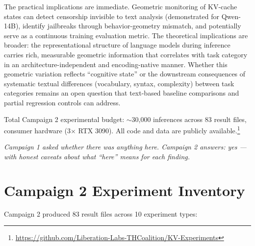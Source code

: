\documentclass[11pt,a4paper]{article}
\begin{document}
The practical implications are immediate. Geometric monitoring of KV-cache states can detect censorship invisible to text analysis (demonstrated for Qwen-14B), identify jailbreaks through behavior-geometry mismatch, and potentially serve as a continuous training evaluation metric. The theoretical implications are broader: the representational structure of language models during inference carries rich, measurable geometric information that correlates with task category in an architecture-independent and encoding-native manner. Whether this geometric variation reflects ``cognitive state'' or the downstream consequences of systematic textual differences (vocabulary, syntax, complexity) between task categories remains an open question that text-based baseline comparisons and partial regression controls can address.

Total Campaign 2 experimental budget: $\sim$30,000 inferences across 83 result files, consumer hardware (3$\times$ RTX 3090). All code and data are publicly available.\footnote{\url{https://github.com/Liberation-Labs-THCoalition/KV-Experiments}}

\medskip
\noindent\emph{Campaign 1 asked whether there was anything here. Campaign 2 answers: yes --- with honest caveats about what ``here'' means for each finding.}




\appendix

\section{Campaign 2 Experiment Inventory}
\label{app:inventory}

Campaign 2 produced 83 result files across 10 experiment types:
\end{document}
